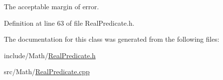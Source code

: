 \-The acceptable margin of error. 



\-Definition at line 63 of file \-Real\-Predicate.\-h.



\-The documentation for this class was generated from the following files\-:\begin{DoxyCompactItemize}
\item 
include/\-Math/\hyperlink{RealPredicate_8h}{\-Real\-Predicate.\-h}\item 
src/\-Math/\hyperlink{RealPredicate_8cpp}{\-Real\-Predicate.\-cpp}\end{DoxyCompactItemize}
